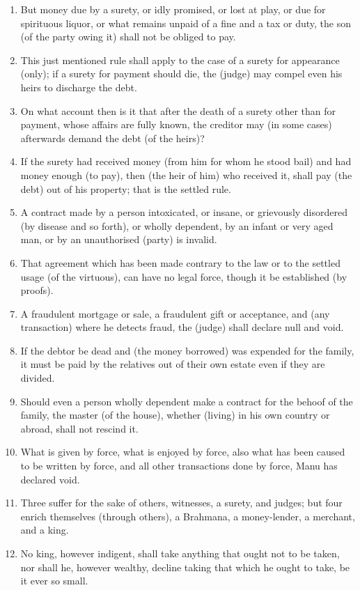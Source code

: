\begin{enumerate}
\item But money due by a surety, or idly promised, or lost at play, or due for spirituous liquor, or what remains unpaid of a fine and a tax or duty, the son (of the party owing it) shall not be obliged to pay.
\item This just mentioned rule shall apply to the case of a surety for appearance (only); if a surety for payment should die, the (judge) may compel even his heirs to discharge the debt.
\item On what account then is it that after the death of a surety other than for payment, whose affairs are fully known, the creditor may (in some cases) afterwards demand the debt (of the heirs)?
\item If the surety had received money (from him for whom he stood bail) and had money enough (to pay), then (the heir of him) who received it, shall pay (the debt) out of his property; that is the settled rule.
\item A contract made by a person intoxicated, or insane, or grievously disordered (by disease and so forth), or wholly dependent, by an infant or very aged man, or by an unauthorised (party) is invalid.
\item That agreement which has been made contrary to the law or to the settled usage (of the virtuous), can have no legal force, though it be established (by proofs).
\item A fraudulent mortgage or sale, a fraudulent gift or acceptance, and (any transaction) where he detects fraud, the (judge) shall declare null and void.
\item If the debtor be dead and (the money borrowed) was expended for the family, it must be paid by the relatives out of their own estate even if they are divided.
\item Should even a person wholly dependent make a contract for the behoof of the family, the master (of the house), whether (living) in his own country or abroad, shall not rescind it.
\item What is given by force, what is enjoyed by force, also what has been caused to be written by force, and all other transactions done by force, Manu has declared void.
\item Three suffer for the sake of others, witnesses, a surety, and judges; but four enrich themselves (through others), a Brahmana, a money-lender, a merchant, and a king.
\item No king, however indigent, shall take anything that ought not to be taken, nor shall he, however wealthy, decline taking that which he ought to take, be it ever so small.

\end{enumerate}
